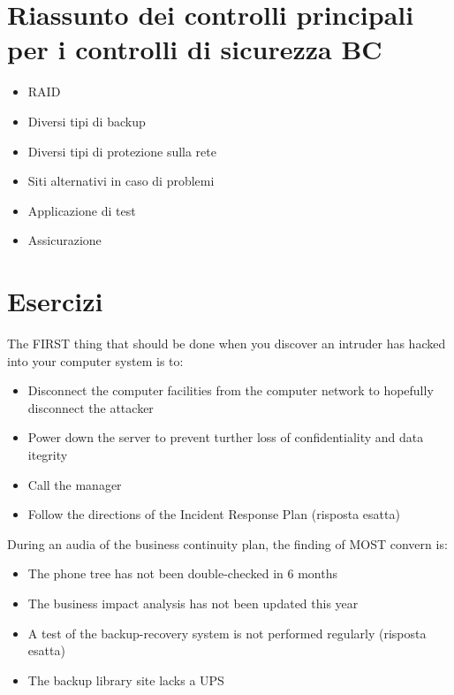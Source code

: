 
\section{Riassunto dei controlli principali per i controlli di sicurezza BC}

\begin{itemize}
  \item RAID
  \item Diversi tipi di backup
  \item Diversi tipi di protezione sulla rete
  \item Siti alternativi in caso di problemi
  \item Applicazione di test
  \item Assicurazione
\end{itemize}

\section{Esercizi}

The FIRST thing that should be done when you discover an intruder has hacked 
into your computer system is to:
\begin{itemize}
  \item Disconnect the computer facilities from the computer network to 
  hopefully disconnect the attacker
  \item Power down the server to prevent turther loss of confidentiality and 
  data itegrity
  \item Call the manager
  \item Follow the directions of the Incident Response Plan (risposta esatta)
\end{itemize}


During an audia of the business continuity plan, the finding of MOST convern is:
\begin{itemize}
  \item The phone tree has not been double-checked in 6 months
  \item The business impact analysis has not been updated this year
  \item A test of the  backup-recovery system is not performed regularly 
  (risposta esatta)
  \item The backup library site lacks a UPS
\end{itemize}
